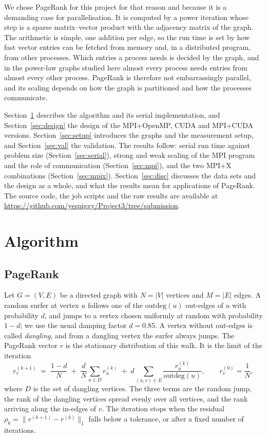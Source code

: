 \documentclass[11pt,a4paper]{article}
\begin{document}
We chose PageRank for this project for that reason and because it is a demanding case for parallelisation. It is computed by a power iteration whose step is a sparse matrix--vector product with the adjacency
matrix of the graph. The arithmetic is simple, one addition per edge, so the run time is set by how fast vector
entries can be fetched from memory and, in a distributed program, from other processes. Which entries a process needs
is decided by the graph, and in the power-law graphs studied here almost every process needs entries from almost
every other process. PageRank is therefore not embarrassingly parallel, and its scaling depends on how the graph is
partitioned and how the processes communicate.

Section~\ref{sec:alg} describes the algorithm and its serial implementation, and Section~\ref{sec:design} the design
of the MPI+OpenMP, CUDA and MPI+CUDA versions. Section~\ref{sec:setup} introduces the graphs and the measurement
setup, and Section~\ref{sec:val} the validation. The results follow: serial run time against problem size
(Section~\ref{sec:serial}), strong and weak scaling of the MPI program and the role of communication
(Section~\ref{sec:mpi}), and the two MPI+X combinations (Section~\ref{sec:mpix}). Section~\ref{sec:disc} discusses
the data sets and the design as a whole, and what the results mean for applications of PageRank. The source code, the job scripts and the raw results are available at
\url{https://github.com/yespiggy/Project3/tree/submission}.

\section{Algorithm}
\label{sec:alg}

\subsection{PageRank}

Let $G=(V,E)$ be a directed graph with $N=|V|$ vertices and $M=|E|$ edges. A random surfer at vertex $u$ follows one
of the $\mathrm{outdeg}(u)$ out-edges of $u$ with probability $d$, and jumps to a vertex chosen uniformly at random
with probability $1-d$; we use the usual damping factor $d=0.85$. A vertex without out-edges is called
\emph{dangling}, and from a dangling vertex the surfer always jumps. The PageRank vector $r$ is the stationary
distribution of this walk. It is the limit of the iteration
\begin{equation}
  r^{(k+1)}_v \;=\; \frac{1-d}{N} \;+\; \frac{d}{N}\sum_{u \in D} r^{(k)}_u \;+\; d \sum_{(u,v)\in E}
  \frac{r^{(k)}_u}{\mathrm{outdeg}(u)}, \qquad r^{(0)}_v = \frac{1}{N},
  \label{eq:pr}
\end{equation}
where $D$ is the set of dangling vertices. The three terms are the random jump, the rank of the dangling vertices
spread evenly over all vertices, and the rank arriving along the in-edges of $v$. The iteration stops when the
residual $\rho_k=\lVert r^{(k+1)}-r^{(k)}\rVert_1$ falls below a tolerance, or after a fixed number of iterations.
\end{document}
